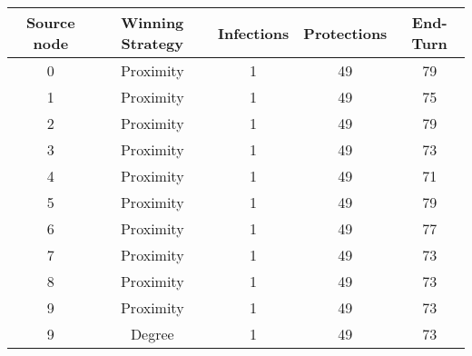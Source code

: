 \documentclass[results.tex]{subfiles}
\begin{document}
    \begin{center}
        \begin{tabular}{| c || c | c | c | c |}
            \hline
            {\bfseries Source node} & {\bfseries Winning Strategy} & {\bfseries Infections} & {\bfseries Protections}
            & {\bfseries End-Turn}
            \\  %
            \hline\hline
            0                       & Proximity                    & 1                      & 49                      & 79                   \\
            \hline
            1                       & Proximity                    & 1                      & 49                      & 75                   \\
            \hline
            2                       & Proximity                    & 1                      & 49                      & 79                   \\
            \hline
            3                       & Proximity                    & 1                      & 49                      & 73                   \\
            \hline
            4                       & Proximity                    & 1                      & 49                      & 71                   \\
            \hline
            5                       & Proximity                    & 1                      & 49                      & 79                   \\
            \hline
            6                       & Proximity                    & 1                      & 49                      & 77                   \\
            \hline
            7                       & Proximity                    & 1                      & 49                      & 73                   \\
            \hline
            8                       & Proximity                    & 1                      & 49                      & 73                   \\
            \hline
            9                       & Proximity                    & 1                      & 49                      & 73                   \\
            \hline
            9                       & Degree                       & 1                      & 49                      & 73                   \\

\end{tabular}
\end{center}
\end{document}
